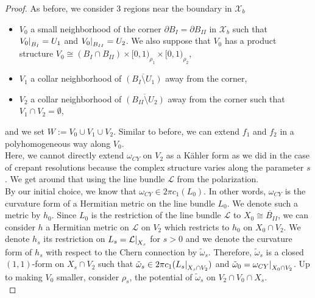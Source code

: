 \documentclass[a4paper,11pt]{article}
\newcommand\restr[2]{{%
  \left.\kern-\nulldelimiterspace %
  #1 %
  \littletaller %
  \right|_{#2} %
  }}
\newcommand{\littletaller}{\mathchoice{\vphantom{\big|}}{}{}{}}
\begin{document}
\begin{proof}
   As before, we consider $3$ regions near the boundary in $\mathcal{X}_b$
\begin{itemize}
    \item $V_0$ a small neighborhood of the corner $\partial B_I= \partial B_{II}$ in $\mathcal{X}_b$ such that $\restr{V_0}{B_{I}} = U_1$ and $\restr{V_0}{B_{II}} = U_2$. We also suppose that $V_0$ has a product structure $V_0 \cong (B_I \cap B_{II}) \times [0,1)_{\rho_1} \times  [0,1)_{\rho_2}$,
    \item $V_1$ a collar neighborhood of $\overline{(B_{I} \setminus U_1)}$ away from the corner,
    \item $V_2$ a collar neighborhood of $\overline{(B_{II} \setminus U_2)}$ away from the corner such that $V_1 \cap V_2 = \emptyset$,
\end{itemize} 
and we set $W:= V_0 \cup V_1 \cup V_2$. Similar to before, we can extend $f_1$ and $f_2$ in a polyhomogeneous way along $V_0$.\\

Here, we cannot directly extend $\omega_{CY}$ on $V_2$ as a Kähler form as we did in the case of crepant resolutions because the complex structure varies along the parameter $s$. We get around that using the line bundle $\mathcal{L}$ from the polarization.\\

By our initial choice, we know that $\omega_{CY} \in 2 \pi c_1(L_0)$. In other words, $\omega_{CY}$ is the curvature form of a Hermitian metric on the line bundle $L_0$. We denote such a metric by $h_0$. Since $L_0$ is the restriction of the line bundle $\mathcal{L}$ to $X_0 \cong \mathring{B_{II}}$, we can consider $h$ a Hermitian metric on $\mathcal{L}$ on $V_2$ which restricts to $h_0$ on $X_0 \cap V_2$. We denote $h_s$ its restriction on $L_s = \restr{\mathcal{L}}{X_s}$ for $s >0$ and we denote the curvature form of $h_s$ with respect to the Chern connection by $\tilde \omega_{s}$. Therefore, $\tilde \omega_{s}$ is a closed $(1,1)$-form on $X_s \cap V_2$ such that $\tilde \omega_{s} \in 2 \pi c_1(\restr{L_s}{X_s \cap V_2})$ and $\tilde \omega_0 = \restr{\omega_{CY}}{X_0 \cap V_2}$. Up to making $V_0$ smaller, consider $\rho_s$, the potential of $\tilde \omega_s$ on $V_2 \cap V_0 \cap X_s$. \\


\end{proof}
\end{document}
